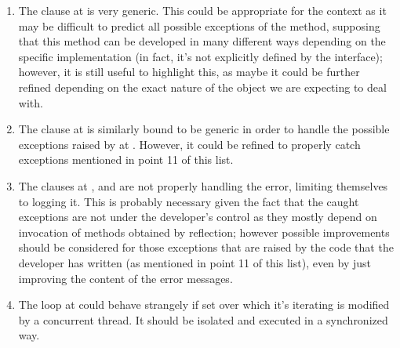 \begin{enumerate}
	\item {} The  clause at  is very generic. This could be appropriate for the context as it may be difficult to predict all possible exceptions of the  method, supposing that this method can be developed in many different ways depending on the specific  implementation (in fact, it's not explicitly defined by the interface); however, it is still useful to highlight this, as maybe it could be further refined depending on the exact nature of the object we are expecting to deal with. 
	\item {} The  clause at  is similarly bound to be generic in order to handle the possible exceptions raised by  at . However, it could be refined to properly catch exceptions mentioned in point 11 of this list. 
	\item {} The  clauses at ,  and  are not properly handling the error, limiting themselves to logging it. This is probably necessary given the fact that the caught exceptions are not under the developer's control as they mostly depend on invocation of methods obtained by reflection; however possible improvements should be considered for those exceptions that are raised by the code that the developer has written (as mentioned in point 11 of this list), even by just improving the content of the error messages. 
	\item {} The  loop at  could behave strangely if set over which it's iterating is modified by a concurrent thread. It should be isolated and executed in a synchronized way. 
	\end{enumerate}
	
	
